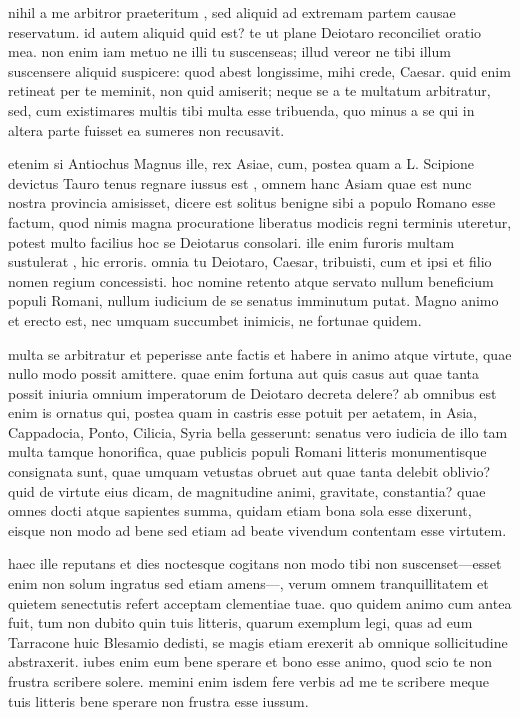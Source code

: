  nihil a me arbitror praeteritum , sed aliquid ad extremam partem causae reservatum. id autem aliquid quid est? te ut plane Deiotaro reconciliet oratio mea. non enim iam metuo ne illi tu suscenseas; illud vereor ne tibi illum suscensere aliquid suspicere: quod abest longissime, mihi crede, Caesar. quid enim retineat per te meminit, non quid amiserit; neque se a te multatum arbitratur, sed, cum existimares multis tibi multa esse tribuenda, quo minus a se qui in altera parte fuisset ea sumeres non recusavit.

 etenim si Antiochus Magnus ille, rex Asiae, cum, postea quam a L. Scipione devictus Tauro tenus regnare iussus est , omnem hanc Asiam quae est nunc nostra provincia amisisset, dicere est solitus benigne sibi a populo Romano esse factum, quod nimis magna procuratione liberatus modicis regni terminis uteretur, potest multo facilius hoc se Deiotarus consolari. ille enim furoris multam sustulerat , hic erroris. omnia tu Deiotaro, Caesar, tribuisti, cum et ipsi et filio nomen regium concessisti. hoc nomine retento atque servato nullum beneficium populi Romani, nullum iudicium de se senatus imminutum putat. Magno animo et erecto est, nec umquam succumbet inimicis, ne fortunae quidem.

 multa se arbitratur et peperisse ante factis et habere in animo atque virtute, quae nullo modo possit amittere. quae enim fortuna aut quis casus aut quae tanta possit iniuria omnium imperatorum de Deiotaro decreta delere? ab omnibus est enim is ornatus qui, postea quam in castris esse potuit per aetatem, in Asia, Cappadocia, Ponto, Cilicia, Syria bella gesserunt: senatus vero iudicia de illo tam multa tamque honorifica, quae publicis populi Romani litteris monumentisque consignata sunt, quae umquam vetustas obruet aut quae tanta delebit oblivio? quid de virtute eius dicam, de magnitudine animi, gravitate, constantia? quae omnes docti atque sapientes summa, quidam etiam bona sola esse dixerunt, eisque non modo ad bene sed etiam ad beate vivendum contentam esse virtutem.

 haec ille reputans et dies noctesque cogitans non modo tibi non suscenset—esset enim non solum ingratus sed etiam amens—, verum omnem tranquillitatem et quietem senectutis refert acceptam clementiae tuae. quo quidem animo cum antea fuit, tum non dubito quin tuis litteris, quarum exemplum legi, quas ad eum Tarracone huic Blesamio dedisti, se magis etiam erexerit ab omnique sollicitudine abstraxerit. iubes enim eum bene sperare et bono esse animo, quod scio te non frustra scribere solere. memini enim isdem fere verbis ad me te scribere meque tuis litteris bene sperare non frustra esse iussum.

